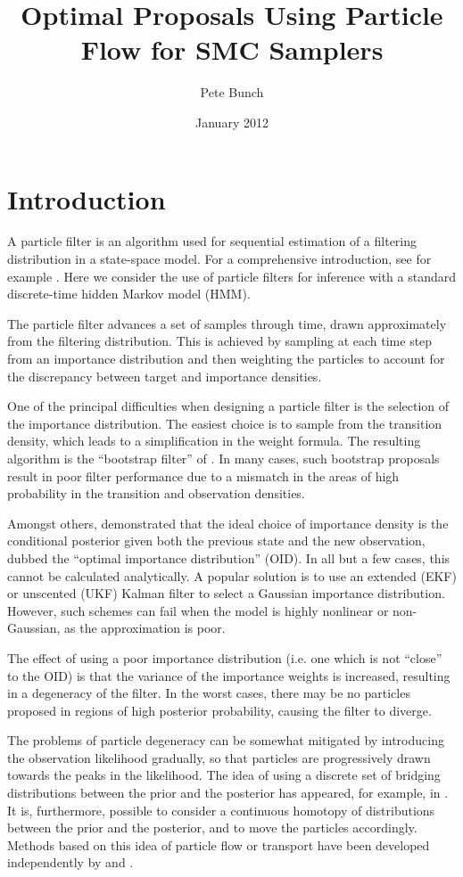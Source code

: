 \documentclass{article}
\title{Optimal Proposals Using Particle Flow for SMC Samplers}
\author{Pete Bunch}
\date{January 2012}
\begin{document}
\maketitle

\section{Introduction}

A particle filter is an algorithm used for sequential estimation of a filtering distribution in a state-space model. For a comprehensive introduction, see for example \cite{Cappe2007,Doucet2009}. Here we consider the use of particle filters for inference with a standard discrete-time hidden Markov model (HMM).

The particle filter advances a set of samples through time, drawn approximately from the filtering distribution. This is achieved by sampling at each time step from an importance distribution and then weighting the particles to account for the discrepancy between target and importance densities.

One of the principal difficulties when designing a particle filter is the selection of the importance distribution. The easiest choice is to sample from the transition density, which leads to a simplification in the weight formula. The resulting algorithm is the ``bootstrap filter'' of \cite{Gordon1993}. In many cases, such bootstrap proposals result in poor filter performance due to a mismatch in the areas of high probability in the transition and observation densities.

Amongst others, \cite{Doucet2000a} demonstrated that the ideal choice of importance density is the conditional posterior given both the previous state and the new observation, dubbed the ``optimal importance distribution'' (OID). In all but a few cases, this cannot be calculated analytically. A popular solution is to use an extended (EKF) or unscented (UKF) Kalman filter to select a Gaussian importance distribution. However, such schemes can fail when the model is highly nonlinear or non-Gaussian, as the approximation is poor.

The effect of using a poor importance distribution (i.e. one which is not ``close'' to the OID) is that the variance of the importance weights is increased, resulting in a degeneracy of the filter. In the worst cases, there may be no particles proposed in regions of high posterior probability, causing the filter to diverge.

The problems of particle degeneracy can be somewhat mitigated by introducing the observation likelihood gradually, so that particles are progressively drawn towards the peaks in the likelihood. The idea of using a discrete set of bridging distributions between the prior and the posterior has appeared, for example, in \cite{Godsill2001b}. It is, furthermore, possible to consider a continuous homotopy of distributions between the prior and the posterior, and to move the particles accordingly. Methods based on this idea of particle flow or transport have been developed independently by \cite{Daum2008,Daum2011d} and \cite{Reich2011}.
\end{document}
